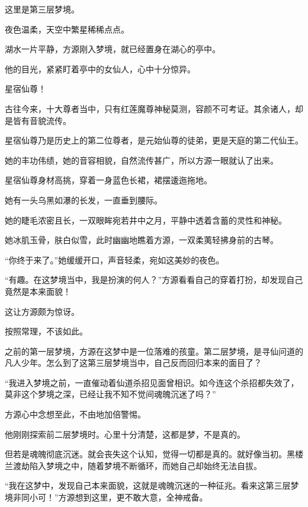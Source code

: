 
\begin{this_body}



这里是第三层梦境。

夜色温柔，天空中繁星稀稀点点。

湖水一片平静，方源刚入梦境，就已经置身在湖心的亭中。

他的目光，紧紧盯着亭中的女仙人，心中十分惊异。

星宿仙尊！

古往今来，十大尊者当中，只有红莲魔尊神秘莫测，容颜不可考证。其余诸人，却是皆有音貌流传。

星宿仙尊乃是历史上的第二位尊者，是元始仙尊的徒弟，更是天庭的第二代仙王。

她的丰功伟绩，她的音容相貌，自然流传甚广，所以方源一眼就认了出来。

星宿仙尊身材高挑，穿着一身蓝色长裙，裙摆逶迤拖地。

她有一头乌黑如瀑的长发，一直垂到腰际。

她的睫毛浓密且长，一双眼眸宛若井中之月，平静中透着含蓄的灵性和神秘。

她冰肌玉骨，肤白似雪，此时幽幽地瞧着方源，一双柔荑轻拂身前的古琴。

“你终于来了。”她缓缓开口，声音轻柔，宛如这美妙的夜色。

“有趣。在这梦境当中，我是扮演的何人？”方源看看自己的穿着打扮，却发现自己竟然是本来面貌！

这让方源颇为惊讶。

按照常理，不该如此。

之前的第一层梦境，方源在这梦中是一位落难的孩童。第二层梦境，是寻仙问道的凡人少年。怎么到了这第三层梦境当中，自己反而回归本来的面目了？

“我进入梦境之前，一直催动着仙道杀招见面曾相识。如今连这个杀招都失效了，莫非这个梦境之深，已经让我不知不觉间魂魄沉迷了吗？”

方源心中念想至此，不由地加倍警惕。

他刚刚探索前二层梦境时。心里十分清楚，这都是梦，不是真的。

但若是魂魄彻底沉迷。就会丧失这个认知，觉得一切都是真的。就好像当初。黑楼兰渡劫陷入梦境之中，随着梦境不断循环，而她自己却始终无法自拔。

“我在这梦中，发现自己本来面貌，这就是魂魄沉迷的一种征兆。看来这第三层梦境非同小可！”方源想到这里，更不敢大意，全神戒备。


\end{this_body}
